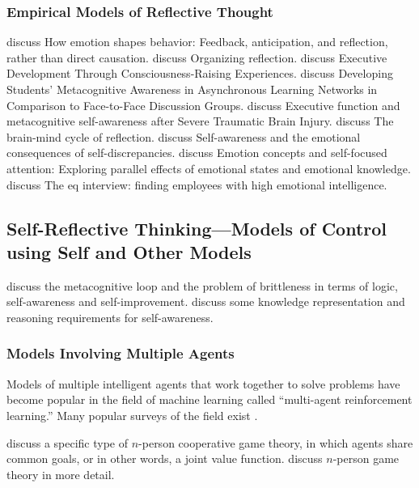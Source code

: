 \subsubsection{Empirical Models of Reflective Thought}


\cite{baumeister2007esb} discuss How emotion shapes behavior: Feedback, anticipation, and reflection, rather than direct causation.
\cite{vince2002or} discuss Organizing reflection.
\cite{mirvis2008edt} discuss Executive Development Through Consciousness-Raising Experiences.
\cite{michalsky2007dsm} discuss Developing Students' Metacognitive Awareness in Asynchronous Learning Networks in Comparison to Face-to-Face Discussion Groups.
\cite{bivona2008efa} discuss Executive function and metacognitive self-awareness after Severe Traumatic Brain Injury.
\cite{irannejad2001bmc} discuss The brain-mind cycle of reflection.
\cite{phillips2005saa} discuss Self-awareness and the emotional consequences of self-discrepancies.
\cite{silvia2006eca} discuss Emotion concepts and self-focused attention: Exploring parallel effects of emotional states and emotional knowledge.
\cite{lynn2008eif3} discuss The eq interview: finding employees with high emotional intelligence.


\subsection{Self-Reflective Thinking---Models of Control using Self and Other Models}

\cite{anderson2005lsa} discuss the metacognitive loop and the problem of brittleness in terms of logic, self-awareness and self-improvement.
\cite{schubert2005skr} discuss some knowledge representation and reasoning requirements for self-awareness.

\subsubsection{Models Involving Multiple Agents}

Models of multiple intelligent agents that work together to solve problems have become popular in the field of machine learning called ``multi-agent reinforcement learning.''
Many popular surveys of the field exist \cite[]{wei1995aal} \cite[]{sen1999lms} \cite[]{stone2000mss} \cite[]{shoham2004mar} \cite[]{yang2004mrl} \cite[]{panait2005cma}.

\cite{boutilier1996pla} discuss a specific type of $n$-person cooperative game theory, in which agents share common goals, or in other words, a joint value function.
\cite{rapoport2001npg} discuss $n$-person game theory in more detail.

